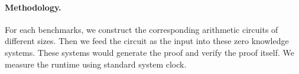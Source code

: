\paragraph{Methodology.} For each benchmarks, we construct the corresponding arithmetic circuits of different sizes. Then we feed the circuit as the input into these zero knowledge systems. These systems would generate the proof and verify the proof itself. We measure the runtime using standard system clock.\\
\begin{figure}[htbp]
{}%
%
%
\quad           
{}
\end{figure}
